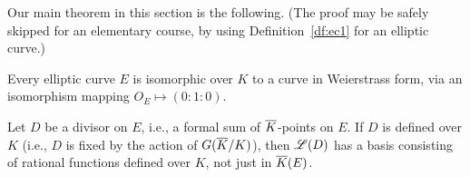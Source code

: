 Our main theorem in this section is the following. (The proof may be safely skipped for an elementary course, by using Definition~\ref{df:ec1} for an elliptic curve.)
\begin{thm}
Every elliptic curve $E$ is isomorphic over $K$ to a curve in Weierstrass form, via an isomorphism mapping $O_E\mapsto (0:1:0)$.
\end{thm}
\begin{fct}
Let $D$ be a divisor on $E$, i.e., a formal sum of $\overline{K}$-points on $E$. If $D$ is defined over $K$ (i.e., $D$ is fixed by the action of $G(\overline{K}/K)$), then $\mathscr{L}(D)$ has a basis consisting of rational functions defined over $K$, not just in $\overline{K}(E)$. 
\end{fct}
